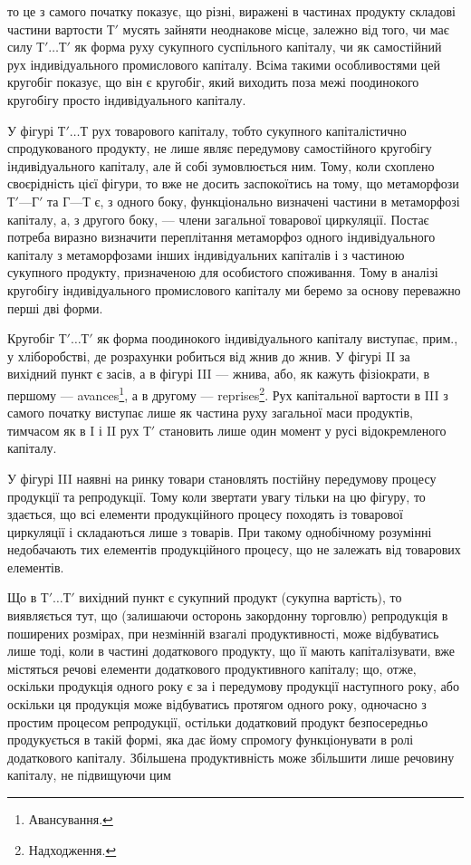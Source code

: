\parcont{}  %
то це з самого початку показує, що різні, виражені в частинах продукту складові частини вартости $Т'$
мусять зайняти неоднакове місце, залежно від того, чи має силу $Т'\dots{} Т'$ як форма руху сукупного
суспільного капіталу, чи як самостійний рух індивідуального промислового капіталу. Всіма такими
особливостями цей кругобіг показує, що він є кругобіг, який виходить поза межі поодинокого кругобігу
просто індивідуального капіталу.

У фігурі $Т'\dots{} Т$ рух товарового капіталу, тобто сукупного капіталістично спродукованого продукту, не
лише являє передумову самостійного кругобігу індивідуального капіталу, але й собі зумовлюється ним.
Тому, коли схоплено своєрідність цієї фігури, то вже не досить заспокоїтись на тому, що метаморфози
$Т' — Г'$ та $Г — Т$ є, з одного боку, функціонально визначені частини в метаморфозі капіталу, а, з
другого боку, — члени загальної товарової циркуляції. Постає потреба виразно визначити переплітання
метаморфоз одного індивідуального капіталу з метаморфозами інших індивідуальних капіталів і з
частиною сукупного продукту, призначеною для особистого споживання. Тому в аналізі кругобігу
індивідуального промислового капіталу ми беремо за основу переважно перші дві форми.

Кругобіг $Т'\dots{} Т'$ як форма поодинокого індивідуального капіталу виступає, прим., у хліборобстві, де
розрахунки робиться від жнив до жнив. У фігурі II за вихідний пункт є засів, а в фігурі III — жнива,
або, як кажуть фізіократи, в першому — avances\footnote*{
Авансування. 
}, а в другому — reprises\footnote*{
Надходження. 
}. Рух капітальної
вартости в III з самого початку виступає лише як частина руху загальної маси продуктів, тимчасом як
в I і II рух $Т'$ становить лише один момент у русі відокремленого капіталу.

У фігурі III наявні на ринку товари становлять постійну передумову процесу продукції та репродукції.
Тому коли звертати увагу тільки на цю фігуру, то здається, що всі елементи продукційного процесу
походять із товарової циркуляції і складаються лише з товарів. При такому однобічному розумінні
недобачають тих елементів продукційного процесу, що не залежать від товарових елементів.

Що в $Т'\dots{} Т'$ вихідний пункт є сукупний продукт (сукупна вартість), то виявляється тут, що
(залишаючи осторонь закордонну торговлю) репродукція в поширених розмірах, при незмінній взагалі
продуктивності, може відбуватись лише тоді, коли в частині додаткового продукту, що її мають
капіталізувати, вже містяться речові елементи додаткового продуктивного капіталу; що, отже, оскільки
продукція одного року є за і передумову продукції наступного року, або оскільки ця продукція може
відбуватись протягом одного року, одночасно з простим процесом репродукції, остільки додатковий
продукт безпосередньо продукується в такій формі, яка дає йому спромогу функціонувати в ролі
додаткового капіталу. Збільшена продуктивність може збільшити лише речовину капіталу, не підвищуючи
цим
\parbreak{}  %
